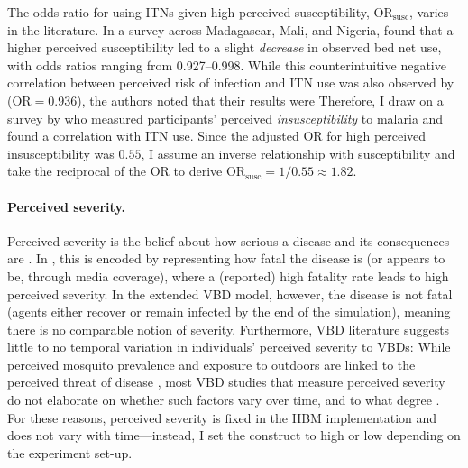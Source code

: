The odds ratio for using ITNs given high perceived susceptibility, $\text{OR}_{\text{susc}}$, varies in the literature. In a survey across Madagascar, Mali, and Nigeria, \citet{storey_associations_2018} found that a higher perceived susceptibility led to a slight \textit{decrease} in observed bed net use, with odds ratios ranging from 0.927--0.998. While this counterintuitive negative correlation between perceived risk of infection and ITN use was also observed by \citet{babalola_factors_2018} ($\text{OR}=0.936$), the authors noted that their results were  Therefore, I draw on a survey by \citet{mensah_individual_2020} who measured participants' perceived \textit{insusceptibility} to malaria and found a correlation with ITN use. Since the adjusted OR for high perceived insusceptibility was $0.55$, I assume an inverse relationship with susceptibility and take the reciprocal of the OR to derive $\text{OR}_{\text{susc}}=1/0.55\approx1.82$.


\paragraph{Perceived severity.}Perceived severity is the belief about how serious a disease and its consequences are \cite{champion_health_2015}. In \citet{durham_incorporating_2012}, this is encoded by representing how fatal the disease is (or appears to be, through media coverage), where a (reported) high fatality rate leads to high perceived severity. In the extended VBD model, however, the disease is not fatal (agents either recover or remain infected by the end of the simulation), meaning there is no comparable notion of severity. Furthermore, VBD literature suggests little to no temporal variation in individuals' perceived severity to VBDs: While perceived mosquito prevalence and exposure to outdoors are linked to the perceived threat of disease \cite{raude_public_2012}, most VBD studies that measure perceived severity do not elaborate on whether such factors vary over time, and to what degree \cite{kakaire_role_2023, watanabe_determinants_2014, storey_associations_2018, babalola_factors_2018}. For these reasons, perceived severity is fixed in the HBM implementation and does not vary with time---instead, I set the construct to high or low depending on the experiment set-up.%

